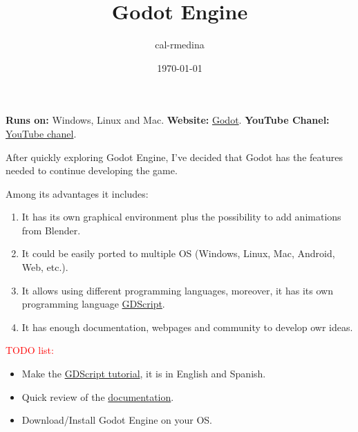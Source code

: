 \documentclass{article}
\title{Godot Engine}
\date{\today}
\author{cal-rmedina}
\begin{document}
  \maketitle

\textbf{Runs on:} Windows, Linux and Mac.
\textbf{Website:} \href{https://godotengine.org/}{Godot}.
\textbf{YouTube Chanel:} \href{https://www.youtube.com/@GodotEngineOfficial/featured}{YouTube chanel}.

After quickly exploring Godot Engine, I've decided that Godot has the features
needed to continue developing the game.

Among its advantages it includes:

\begin{enumerate}
  \item It has its own graphical environment plus the possibility to add animations
from Blender.
  \item It could be easily ported to multiple OS (Windows, Linux, Mac, Android,
Web, etc.). 
  \item It allows using different programming languages, moreover, it has its
own programming language \href{https://gdscript.com}{GDScript}.
  \item It has enough documentation, webpages and community to develop owr ideas.
\end{enumerate}

\textcolor{red}{TODO list:}

\begin{itemize}
  \item Make the \href{https://gdquest.github.io/learn-gdscript}{GDScript
tutorial}, it is in English and Spanish.
  \item Quick review of the \href{https://docs.godotengine.org/en/stable}{documentation}.
  \item Download/Install Godot Engine on your OS.
\end{itemize}
\end{document}
